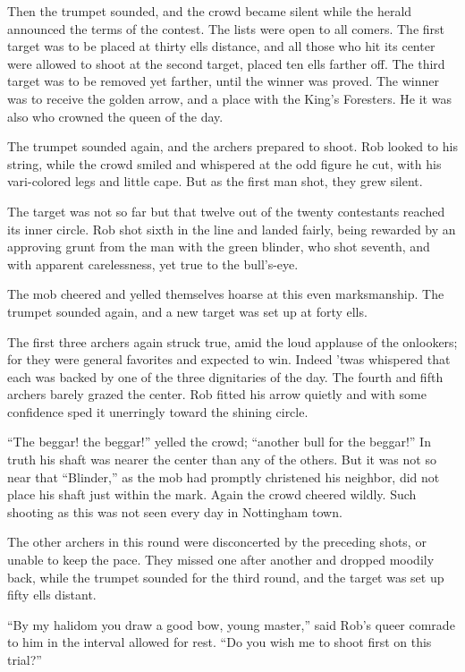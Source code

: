 Then the trumpet sounded, and the crowd became silent while the herald
announced the terms of the contest. The lists were open to all comers.
The first target was to be placed at thirty ells distance, and all those
who hit its center were allowed to shoot at the second target, placed
ten ells farther off. The third target was to be removed yet farther,
until the winner was proved. The winner was to receive the golden arrow,
and a place with the King's Foresters. He it was also who crowned the
queen of the day.

The trumpet sounded again, and the archers prepared to shoot. Rob looked
to his string, while the crowd smiled and whispered at the odd figure he
cut, with his vari-colored legs and little cape. But as the first man
shot, they grew silent.

The target was not so far but that twelve out of the twenty contestants
reached its inner circle. Rob shot sixth in the line and landed fairly,
being rewarded by an approving grunt from the man with the green
blinder, who shot seventh, and with apparent carelessness, yet true to
the bull's-eye.

The mob cheered and yelled themselves hoarse at this even marksmanship.
The trumpet sounded again, and a new target was set up at forty ells.

The first three archers again struck true, amid the loud applause of the
onlookers; for they were general favorites and expected to win. Indeed
'twas whispered that each was backed by one of the three dignitaries of
the day. The fourth and fifth archers barely grazed the center. Rob
fitted his arrow quietly and with some confidence sped it unerringly
toward the shining circle.

``The beggar! the beggar!'' yelled the crowd; ``another bull for the
beggar!'' In truth his shaft was nearer the center than any of the
others. But it was not so near that ``Blinder,'' as the mob had promptly
christened his neighbor, did not place his shaft just within the mark.
Again the crowd cheered wildly. Such shooting as this was not seen every
day in Nottingham town.

The other archers in this round were disconcerted by the preceding
shots, or unable to keep the pace. They missed one after another and
dropped moodily back, while the trumpet sounded for the third round, and
the target was set up fifty ells distant.

``By my halidom you draw a good bow, young master,'' said Rob's queer
comrade to him in the interval allowed for rest. ``Do you wish me to
shoot first on this trial?''

